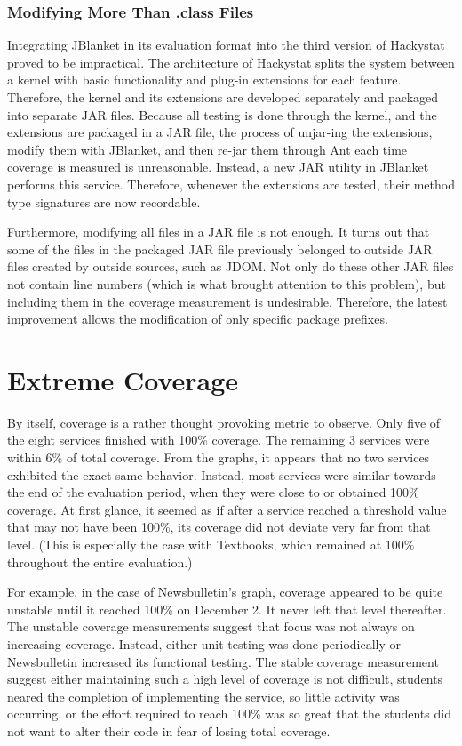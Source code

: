 \subsubsection{Modifying More Than .class Files}
Integrating JBlanket in its evaluation format into the third version of
Hackystat proved to be impractical.  The architecture of Hackystat splits
the system between a kernel with basic functionality and plug-in extensions
for each feature.  Therefore, the kernel and its extensions are developed
separately and packaged into separate JAR files.  Because all testing is
done through the kernel, and the extensions are packaged in a JAR file, the
process of unjar-ing the extensions, modify them with JBlanket, and then
re-jar them through Ant each time coverage is measured is unreasonable.
Instead, a new JAR utility in JBlanket performs this service.  Therefore,
whenever the extensions are tested, their method type signatures are now
recordable.

Furthermore, modifying all files in a JAR file is not enough.  It turns out
that some of the files in the packaged JAR file previously belonged to
outside JAR files created by outside sources, such as JDOM.  Not only do
these other JAR files not contain line numbers (which is what brought
attention to this problem), but including them in the coverage measurement
is undesirable.  Therefore, the latest improvement allows the modification
of only specific package prefixes.

\section{Extreme Coverage} \label{section.extreme.coverage}
By itself, coverage is a rather thought provoking metric to observe.  Only
five of the eight services finished with 100\% coverage.  The remaining 3
services were within 6\% of total coverage.  From the graphs, it appears
that no two services exhibited the exact same behavior.  Instead, most
services were similar towards the end of the evaluation period, when they
were close to or obtained 100\% coverage.  At first glance, it seemed as if
after a service reached a threshold value that may not have been 100\%, its
coverage did not deviate very far from that level.  (This is especially the
case with Textbooks, which remained at 100\% throughout the entire
evaluation.)

For example, in the case of Newsbulletin's graph, coverage appeared to be
quite unstable until it reached 100\% on December 2.  It never left that
level thereafter.  The unstable coverage measurements suggest that focus
was not always on increasing coverage.  Instead, either unit testing was
done periodically or Newsbulletin increased its functional testing.  The
stable coverage measurement suggest either maintaining such a high level of
coverage is not difficult, students neared the completion of implementing
the service, so little activity was occurring, or the effort required to
reach 100\% was so great that the students did not want to alter their code
in fear of losing total coverage.

